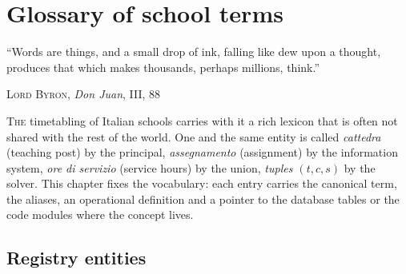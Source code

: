 \chapter{Glossary of school terms}
\label{ch:terminologia_didattica}

\epigraph{``Words are things, and a small drop of ink, falling
like dew upon a thought, produces that which makes thousands,
perhaps millions, think.''}{\textsc{Lord Byron}, \emph{Don Juan},
III, 88}

\lettrine[lines=3]{T}{he} timetabling of Italian schools carries
with it a rich lexicon that is often not shared with the rest of
the world. One and the same entity is called \emph{cattedra}
(teaching post) by the principal, \emph{assegnamento} (assignment)
by the information system, \emph{ore di servizio} (service hours)
by the union, \emph{tuples $(t,c,s)$} by the solver. This chapter
fixes the vocabulary: each entry carries the canonical term, the
aliases, an operational definition and a pointer to the database
tables or the code modules where the concept lives.

\section{Registry entities}

